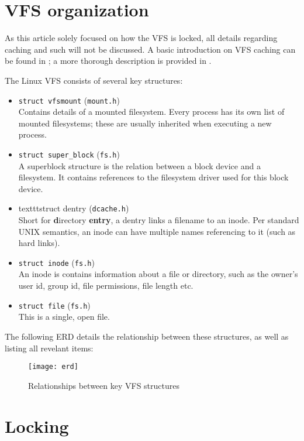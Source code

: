 \documentclass[a4paper,11pt]{article}
\begin{document}
\section{VFS organization}

As this article solely focused on how the VFS is locked, all details regarding caching and such will not be discussed. A basic introduction on VFS caching can be found in \cite{love05kerneldev}; a more thorough description is provided in \cite{springer05techreport}.

The Linux VFS consists of several key structures:

\begin{itemize}
\item \texttt{struct vfsmount} (\texttt{mount.h}) \\
Contains details of a mounted filesystem. Every process has its own list of mounted filesystems; these are usually inherited when executing a new process.
\item \texttt{struct super\_block} (\texttt{fs.h}) \\
A superblock structure is the relation between a block device and a filesystem. It contains references to the filesystem driver used for this block device.
\item texttt{struct dentry} (\texttt{dcache.h}) \\
Short for \textbf{d}irectory \textbf{entry}, a dentry links a filename to an inode. Per standard UNIX semantics, an inode can have multiple names referencing to it (such as hard links).
\item \texttt{struct inode} (\texttt{fs.h}) \\
An inode is contains information about a file or directory, such as the owner's user id, group id, file permissions, file length etc.
\item \texttt{struct file} (\texttt{fs.h}) \\
This is a single, open file.
\end{itemize}

The following ERD details the relationship between these structures, as well as listing all revelant items:

\begin{figure}[h]
\texttt{[image: erd]}
\caption{Relationships between key VFS structures}
\end{figure}

\section{Locking}
\end{document}
